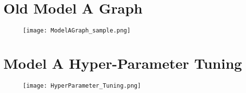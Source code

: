 \section{Old Model A Graph}
\begin{figure}[h!]
    \centering
    \texttt{[image: ModelAGraph\_sample.png]}
    \label{fig:modelA_original_graph_gs_neither}
\end{figure}
\newpage

\section{Model A Hyper-Parameter Tuning} \label{appendix:Model_A_Hyper-Parameter_Tuning}
\begin{figure}[h!]
    \centering
    \texttt{[image: HyperParameter\_Tuning.png]}
    \label{fig:modelA_hyperparam_tuning}
\end{figure}

